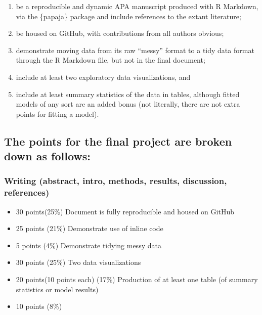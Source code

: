 \documentclass[man]{apa6}
\providecommand{\tightlist}{%
  \setlength{\itemsep}{0pt}\setlength{\parskip}{0pt}}
\begin{document}
\begin{enumerate}
\def\labelenumi{(\alph{enumi})}
\tightlist
\item
  be a reproducible and dynamic APA manuscript produced with R Markdown,
  via the \{papaja\} package and include references to the extant
  literature;
\item
  be housed on GitHub, with contributions from all authors obvious;
\item
  demonstrate moving data from its raw \enquote{messy} format to a tidy
  data format through the R Markdown file, but not in the final
  document;
\item
  include at least two exploratory data visualizations, and
\item
  include at least summary statistics of the data in tables, although
  fitted models of any sort are an added bonus (not literally, there are
  not extra points for fitting a model).
\end{enumerate}

\subsection{The points for the final project are broken down as
follows:}\label{the-points-for-the-final-project-are-broken-down-as-follows}

\subsubsection{Writing (abstract, intro, methods, results, discussion,
references)}\label{writing-abstract-intro-methods-results-discussion-references}

\begin{itemize}
\tightlist
\item
  30 points(25\%) Document is fully reproducible and housed on GitHub
\item
  25 points (21\%) Demonstrate use of inline code
\item
  5 points (4\%) Demonstrate tidying messy data
\item
  30 points (25\%) Two data visualizations
\item
  20 points(10 points each) (17\%) Production of at least one table (of
  summary statistics or model results)
\item
  10 points (8\%)
\end{itemize}
\end{document}
